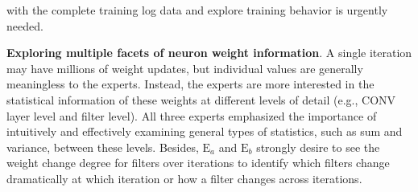 \documentclass[format=acmsmall, review=false, screen=true]{acmart}
\newcommand{\ea}{{$\mathrm{E}_a$}\xspace}
\newcommand{\eb}{{$\mathrm{E}_b$}\xspace}
\newcommand{\dy}{\textcolor[rgb]{0,0,0}}
\begin{document}
with the complete training log data and explore training behavior is urgently needed. %

	\item \textbf{Exploring multiple facets of neuron weight information}.
	A single iteration may have millions of weight updates, but individual values are generally meaningless to the experts.
	Instead, the experts are more interested in the statistical information of these weights at different levels of detail (e.g., CONV layer level and filter level).
	All three experts emphasized the importance of intuitively and effectively examining general types of statistics, such as sum and variance, between these levels.
	Besides, \ea and \eb strongly desire to see the weight change degree for filters over iterations to identify which filters change dramatically at which iteration or how a filter changes across iterations.
\end{document}
